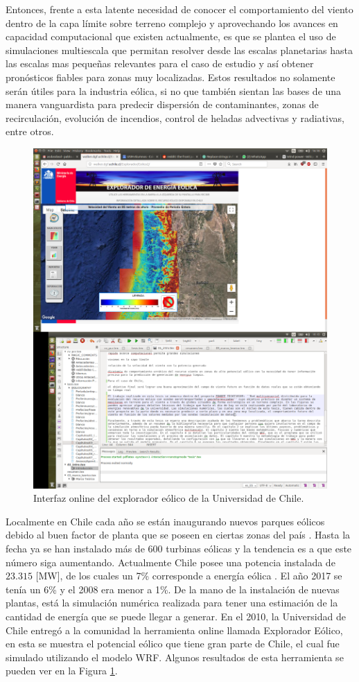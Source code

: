 Entonces, frente a esta latente necesidad de conocer el comportamiento del viento dentro de la capa límite sobre terreno complejo y aprovechando los avances en capacidad computacional que existen actualmente, es que se plantea el uso de simulaciones multiescala que permitan resolver desde las escalas planetarias hasta las escalas mas pequeñas relevantes para el caso de estudio y así obtener pronósticos fiables para zonas muy localizadas. Estos resultados no solamente serán útiles para la industria eólica, si no que también sientan las bases de una manera vanguardista para predecir dispersión de contaminantes, zonas de recirculación, evolución de incendios, control de heladas advectivas y radiativas, entre otros.

\begin{figure}[h]
	\centering
	\includegraphics[width=0.9\linewidth,trim={1.4cm 28cm 15cm 3.4cm},clip]{Imagenes/01/explo}
	\caption{Interfaz online del explorador eólico de la Universidad de Chile.}
	\label{fig:01_explorador}
\end{figure}

Localmente en Chile cada año se están inaugurando nuevos parques eólicos debido al buen factor de planta que se poseen en ciertas zonas del país \citep{anuariocne2018}. Hasta la fecha ya se han instalado más de 600 turbinas eólicas y la tendencia es a que este número siga aumentando. Actualmente Chile posee una potencia instalada de $23.315$ [MW], de los cuales un 7\% corresponde a energía eólica \citep{anuariocne2018}. El año 2017 se tenía un 6\% y el 2008 era menor a 1\%. De la mano de la instalación de nuevas plantas, está la simulación numérica realizada para tener una estimación de la cantidad de energía que se puede llegar a generar. En el 2010, la Universidad de Chile entregó a la comunidad la herramienta online llamada Explorador Eólico, en esta se muestra el potencial eólico que tiene gran parte de Chile, el cual fue simulado utilizando el modelo WRF. Algunos resultados de esta herramienta se pueden ver en la Figura \ref{fig:01_explorador}.


